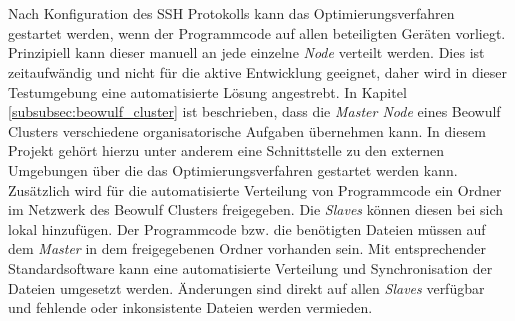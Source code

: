 \\\\
Nach Konfiguration des \ac{SSH} Protokolls kann das Optimierungsverfahren gestartet werden, wenn der Programmcode auf allen beteiligten Geräten vorliegt. Prinzipiell kann dieser manuell an jede einzelne \emph{Node} verteilt werden. Dies ist zeitaufwändig und nicht für die aktive Entwicklung geeignet, daher wird in dieser Testumgebung eine automatisierte Lösung angestrebt. In Kapitel \ref{subsubsec:beowulf_cluster} ist beschrieben, dass die \emph{Master Node} eines Beowulf Clusters verschiedene organisatorische Aufgaben übernehmen kann. In diesem Projekt gehört hierzu unter anderem eine Schnittstelle zu den externen Umgebungen über die das Optimierungsverfahren gestartet werden kann. Zusätzlich wird für die automatisierte Verteilung von Programmcode ein Ordner im Netzwerk des Beowulf Clusters freigegeben. Die \emph{Slaves} können diesen bei sich lokal hinzufügen. Der Programmcode bzw. die benötigten Dateien müssen auf dem \emph{Master} in dem freigegebenen Ordner vorhanden sein. Mit entsprechender Standardsoftware kann eine automatisierte Verteilung und Synchronisation der Dateien umgesetzt werden. Änderungen sind direkt auf allen \emph{Slaves} verfügbar und fehlende oder inkonsistente Dateien werden vermieden.
